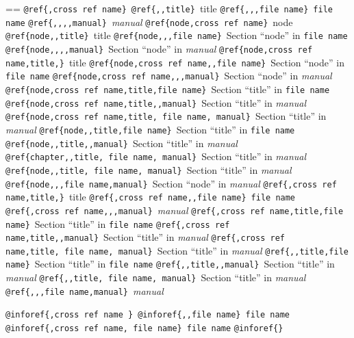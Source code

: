 \documentclass{book}
\makeatletter
\newenvironment{GNUTexinfopreformatted}{%
  \par\GNUTobeylines\obeyspaces\frenchspacing
  \parskip=\z@\parindent=\z@}{}
{\catcode`\^^M=13 \gdef\GNUTobeylines{\catcode`\^^M=13 \def^^M{\null\par}}}
\newenvironment{GNUTexinfoindented}
  {\begin{list}{}{}
  \item\relax}
  {\end{list}}
\makeatother
\begin{document}
\begin{GNUTexinfoindented}
\begin{GNUTexinfopreformatted}
\texttt{@ref\{,cross ref name\}}\ 
\texttt{@ref\{{,}{,}title\}}\ title
\texttt{@ref\{{,}{,},file name\}}\ \texttt{file name}
\texttt{@ref\{{,}{,}{,}{,}manual\}}\ \textsl{manual}
\texttt{@ref\{node,cross ref name\}}\ node
\texttt{@ref\{node{,}{,}title\}}\ title
\texttt{@ref\{node{,}{,},file name\}}\ Section ``node'' in \texttt{file name}
\texttt{@ref\{node{,}{,}{,}{,}manual\}}\ Section ``node'' in \textsl{manual}
\texttt{@ref\{node,cross ref name,title,\}}\ title
\texttt{@ref\{node,cross ref name{,}{,}file name\}}\ Section ``node'' in \texttt{file name}
\texttt{@ref\{node,cross ref name{,}{,},manual\}}\ Section ``node'' in \textsl{manual}
\texttt{@ref\{node,cross ref name,title,file name\}}\ Section ``title'' in \texttt{file name}
\texttt{@ref\{node,cross ref name,title{,}{,}manual\}}\ Section ``title'' in \textsl{manual}
\texttt{@ref\{node,cross ref name,title,\ file name,\ manual\}}\ Section ``title'' in \textsl{manual}
\texttt{@ref\{node{,}{,}title,file name\}}\ Section ``title'' in \texttt{file name}
\texttt{@ref\{node{,}{,}title{,}{,}manual\}}\ Section ``title'' in \textsl{manual}
\texttt{@ref\{chapter{,}{,}title,\ file name,\ manual\}}\ Section ``title'' in \textsl{manual}
\texttt{@ref\{node{,}{,}title,\ file name,\ manual\}}\ Section ``title'' in \textsl{manual}
\texttt{@ref\{node{,}{,},file name,manual\}}\ Section ``node'' in \textsl{manual}
\texttt{@ref\{,cross ref name,title,\}}\ title
\texttt{@ref\{,cross ref name{,}{,}file name\}}\ \texttt{file name}
\texttt{@ref\{,cross ref name{,}{,},manual\}}\ \textsl{manual}
\texttt{@ref\{,cross ref name,title,file name\}}\ Section ``title'' in \texttt{file name}
\texttt{@ref\{,cross ref name,title{,}{,}manual\}}\ Section ``title'' in \textsl{manual}
\texttt{@ref\{,cross ref name,title,\ file name,\ manual\}}\ Section ``title'' in \textsl{manual}
\texttt{@ref\{{,}{,}title,file name\}}\ Section ``title'' in \texttt{file name}
\texttt{@ref\{{,}{,}title{,}{,}manual\}}\ Section ``title'' in \textsl{manual}
\texttt{@ref\{{,}{,}title,\ file name,\ manual\}}\ Section ``title'' in \textsl{manual}
\texttt{@ref\{{,}{,},file name,manual\}}\ \textsl{manual}

\texttt{@inforef\{,cross ref name \}}\ 
\texttt{@inforef\{{,}{,}file name\}}\ \texttt{file name}
\texttt{@inforef\{,cross ref name,\ file name\}}\ \texttt{file name}
\texttt{@inforef\{\}}\ 


\end{GNUTexinfopreformatted}
\end{GNUTexinfoindented}

%
%
%
%
%
%
%
\index[fn]{.@\texttt{.}}%
\index[fn]{?@\texttt{?}}%
%
\end{document}
